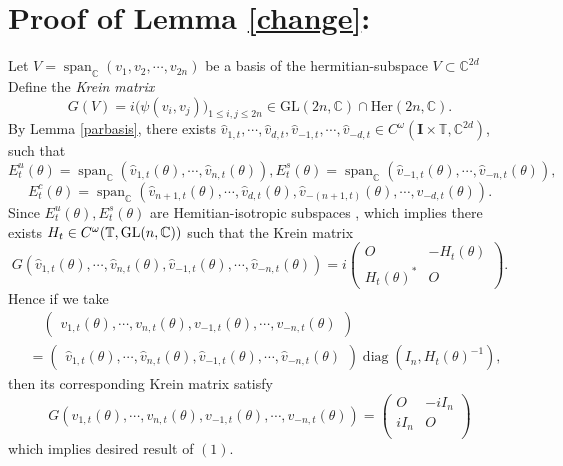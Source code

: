 \documentclass[11pt]{amsart}
\theoremstyle{remark}
\theoremstyle{definition}
\newcommand{\C}{{\mathbf C}}
\newcommand{\I}{{\mathbf I}}
\newcommand{\T}{{\mathbf T}}
\newcommand{\GL}{{\rm GL}}
\def \C{{\mathcal{C}}}
\def\C{{\mathbb C}}
\def\T{{\mathbb T}}
\begin{document}
	\section{Proof of Lemma \ref{change}:}\label{change-proof}

 Let $V=\operatorname{span}_{\C}(v_1,v_2,\cdots,v_{2n})$ be a basis of 
the hermitian-subspace $V \subset \C^{2d}$  Define the \textit{Krein matrix} 
\[
G(V) = i \big( \psi(v_i, v_j) \big)_{1 \leq i,j \leq 2n} \in \mathrm{GL}(2n, \mathbb{C})\cap \mathrm{Her}(2n,\C).
\] By Lemma \ref{parbasis}, 
there exists
$\hat{v}_{1,t}, \cdots, \hat{v}_{d,t}, \hat{v}_{-1,t}, \cdots, \hat{v}_{-d,t} \in C^{\omega}(\I\times\T, \mathbb{C}^{2d})$, such that 
$$E^{u}_t(\theta)=\operatorname{span}_{\C}\left(\hat{v}_{1,t}(\theta), \cdots, \hat{v}_{n,t}(\theta)\right),E^{s}_t(\theta)=\operatorname{span}_{\C}\left(\hat{v}_{-1,t}(\theta), \cdots, \hat{v}_{-n,t}(\theta)\right),$$
$$
E^c_t(\theta)=\operatorname{span}_{\C}(\hat{v}_{n+1,t}(\theta), \cdots, \hat{v}_{d,t}(\theta),\hat{v}_{-(n+1,t)}(\theta), \cdots, \hat{v}_{-d,t}(\theta)).
$$
Since $E^u_t(\theta),E^s_t(\theta)$ are Hemitian-isotropic subspaces \cite{WXZ}, which implies there exists $H_t \in C^\omega(\T,\GL(n,\C))$ such that the Krein matrix $$G(\hat{v}_{1,t}(\theta),\cdots,\hat{v}_{n,t}(\theta),\hat{v}_{-1,t}(\theta),\cdots,\hat{v}_{-n,t}(\theta))=i \begin{pmatrix}
    O & -H_t(\theta) \\
    H_t(\theta)^* & O
\end{pmatrix}.
$$
Hence if we take 
$$\begin{aligned}
    & \quad \begin{pmatrix}
   {v}_{1,t}(\theta),\cdots,{v}_{n,t}(\theta),{v}_{-1,t}(\theta),\cdots,{v}_{-n,t}(\theta)
\end{pmatrix}\\&=\begin{pmatrix}
    \hat{v}_{1,t}(\theta),\cdots,\hat{v}_{n,t}(\theta),\hat{v}_{-1,t}(\theta),\cdots,\hat{v}_{-n,t}(\theta)
\end{pmatrix}\operatorname{diag}(I_n,H_t(\theta)^{-1}),
\end{aligned}$$
then its corresponding Krein matrix satisfy 
$$G( {v}_{1,t}(\theta),\cdots,{v}_{n,t}(\theta),{v}_{-1,t}(\theta),\cdots,{v}_{-n,t}(\theta)) =
\begin{pmatrix}
    O & -iI_n \\
    iI_n & O \\
\end{pmatrix}$$
which implies desired result of $(1)$. 
\end{document}

